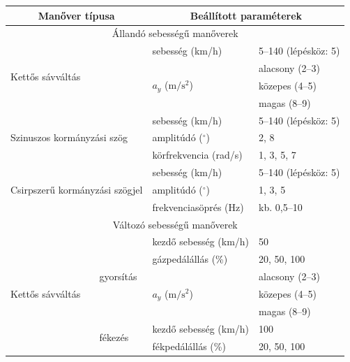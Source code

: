 \documentclass[12pt,a4paper,onehalfspacing, oneside]{book} %
\begin{document}
\begin{table}[htb!]
\begin{center}
\begin{tabular}{llll}
\hline \hline
\multicolumn{2}{c|}{Manőver típusa} & \multicolumn{2}{c}{Beállított paraméterek} \\ \hline \hline
\multicolumn{4}{c}{Állandó sebességű manőverek} \\ \hline \hline
\multicolumn{2}{l|}{\multirow{4}{*}{Kettős sávváltás}} & sebesség (km/h) & 5--140 (lépésköz: 5) \\
\multicolumn{2}{l|}{} & \multirow{3}{*}{$a_y$ ($\mathrm{m/s^2}$)} & alacsony (2--3) \\
\multicolumn{2}{l|}{} & & közepes (4--5) \\
\multicolumn{2}{l|}{} & & magas (8--9) \\ \hline
\multicolumn{2}{l|}{\multirow{3}{*}{Szinuszos kormányzási szög}} & sebesség (km/h) & 5--140 (lépésköz: 5) \\
\multicolumn{2}{l|}{} & amplitúdó ($^\circ$) & 2, 8 \\
\multicolumn{2}{l|}{} & körfrekvencia (rad/s) & 1, 3, 5, 7 \\ \hline
\multicolumn{2}{l|}{\multirow{3}{*}{Csirpszerű kormányzási szögjel}} & sebesség (km/h) & 5--140 (lépésköz: 5) \\
\multicolumn{2}{l|}{} & amplitúdó ($^\circ$) & 1, 3, 5 \\
\multicolumn{2}{l|}{} & frekvenciasöprés (Hz) & kb. 0,5--10 \\ \hline \hline
\multicolumn{4}{c}{Változó sebességű manőverek} \\ \hline \hline
\multicolumn{1}{l|}{\multirow{10}{*}{Kettős sávváltás}} & \multicolumn{1}{l|}{\multirow{5}{*}{gyorsítás}} & kezdő sebesség (km/h) & 50 \\
\multicolumn{1}{l|}{} & \multicolumn{1}{l|}{} & gázpedálállás (\%) & 20, 50, 100 \\
\multicolumn{1}{l|}{} & \multicolumn{1}{l|}{} & \multirow{3}{*}{$a_y$ ($\mathrm{m/s^2}$)} & alacsony (2--3) \\
\multicolumn{1}{l|}{} & \multicolumn{1}{l|}{} & & közepes (4--5) \\
\multicolumn{1}{l|}{} & \multicolumn{1}{l|}{} & & magas (8--9) \\ \cline{2-4}
\multicolumn{1}{l|}{} & \multicolumn{1}{l|}{\multirow{5}{*}{fékezés}} & kezdő sebesség (km/h) & 100 \\
\multicolumn{1}{l|}{} & \multicolumn{1}{l|}{} & fékpedálállás (\%) & 20, 50, 100 \\

\end{tabular}
\end{center}
\end{table}
\end{document}
